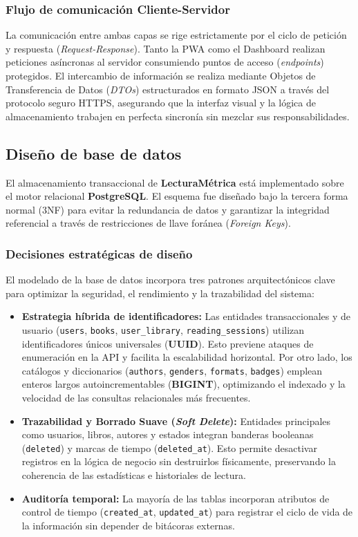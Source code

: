 \documentclass[12pt, atypical, journal]{article}
\begin{document}
\subsubsection{Flujo de comunicación Cliente-Servidor}
La comunicación entre ambas capas se rige estrictamente por el ciclo de petición y respuesta (\textit{Request-Response}). Tanto la PWA como el Dashboard realizan peticiones asíncronas al servidor consumiendo puntos de acceso (\textit{endpoints}) protegidos. El intercambio de información se realiza mediante Objetos de Transferencia de Datos (\textit{DTOs}) estructurados en formato JSON a través del protocolo seguro HTTPS, asegurando que la interfaz visual y la lógica de almacenamiento trabajen en perfecta sincronía sin mezclar sus responsabilidades.

\subsection{Diseño de base de datos}

El almacenamiento transaccional de \textbf{LecturaMétrica} está implementado sobre el motor relacional \textbf{PostgreSQL}. El esquema fue diseñado bajo la tercera forma normal (3NF) para evitar la redundancia de datos y garantizar la integridad referencial a través de restricciones de llave foránea (\textit{Foreign Keys}).

\subsubsection{Decisiones estratégicas de diseño}
El modelado de la base de datos incorpora tres patrones arquitectónicos clave para optimizar la seguridad, el rendimiento y la trazabilidad del sistema:

\begin{itemize}
    \item \textbf{Estrategia híbrida de identificadores:} Las entidades transaccionales y de usuario (\texttt{users}, \texttt{books}, \texttt{user\_library}, \texttt{reading\_sessions}) utilizan identificadores únicos universales (\textbf{UUID}). Esto previene ataques de enumeración en la API y facilita la escalabilidad horizontal. Por otro lado, los catálogos y diccionarios (\texttt{authors}, \texttt{genders}, \texttt{formats}, \texttt{badges}) emplean enteros largos autoincrementables (\textbf{BIGINT}), optimizando el indexado y la velocidad de las consultas relacionales más frecuentes.
    \item \textbf{Trazabilidad y Borrado Suave (\textit{Soft Delete}):} Entidades principales como usuarios, libros, autores y estados integran banderas booleanas (\texttt{deleted}) y marcas de tiempo (\texttt{deleted\_at}). Esto permite desactivar registros en la lógica de negocio sin destruirlos físicamente, preservando la coherencia de las estadísticas e historiales de lectura.
    \item \textbf{Auditoría temporal:} La mayoría de las tablas incorporan atributos de control de tiempo (\texttt{created\_at}, \texttt{updated\_at}) para registrar el ciclo de vida de la información sin depender de bitácoras externas.
\end{itemize}
\end{document}
